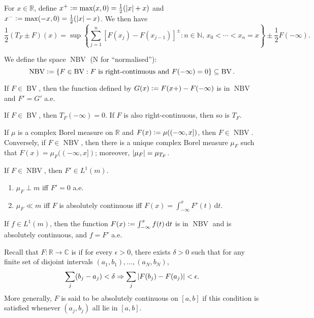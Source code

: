 \documentclass[12pt]{article}	%
\DeclareMathOperator{\BV}{BV}
\DeclareMathOperator{\NBV}{NBV}
\begin{document}
For $x \in \mathbb{R}$, define $x^{+} \vcentcolon= \max(x, 0) = \frac{1}{2}({\left\lvert x \right\lvert} + x)$ and $x^{-} \vcentcolon= \max(-x, 0) = \frac{1}{2}({\left\lvert x \right\lvert} - x)$. We then have
\begin{equation*} 
	\frac{1}{2}(T_{F} \pm F)(x) = \sup\left\{\sum_{j = 1}^{n} \left[F(x_{j}) - F(x_{j - 1})\right]^{\pm} : n \in \mathbb{N},\, x_{0} < \cdots < x_{n} = x \right\} \pm \frac{1}{2} F(-\infty).
\end{equation*}

We define the space $\NBV$ (N for ``normalised''):
\begin{equation*} 
	\NBV \vcentcolon= \{F \in \BV : F \text{ is right-continuous and } F(-\infty) = 0\} \subset \BV.
\end{equation*}

If $F \in \BV$, then the function defined by $G(x) \vcentcolon= F(x+) - F(-\infty)$ is in $\NBV$ and $F' = G'$ a.e.

\begin{prop}
	If $F \in \BV$, then $T_{F}(-\infty) = 0$. If $F$ is also right-continuous, then so is $T_{F}$.
\end{prop}

\begin{thm}
	If $\mu$ is a complex Borel measure on $\mathbb{R}$ and $F(x) \vcentcolon= \mu((-\infty, x])$, then $F \in \NBV$. \newline
	Conversely, if $F \in \NBV$, then there is a unique complex Borel measure $\mu_{F}$ such that $F(x) = \mu_{F}((-\infty, x])$; moreover, ${\left\lvert \mu_{F} \right\lvert} = \mu_{T_{F}}$.
\end{thm}

\begin{prop}
	If $F \in \NBV$, then $F' \in L^{1}(m)$.
	\begin{enumerate}
		\item $\mu_{F} \perp m$ iff $F' = 0$ a.e.
		\item $\mu_{F} \ll m$ iff $F$ is absolutely continuous iff $F(x) = \int_{-\infty}^{x} F'(t) \,{\mathrm{d}}t$.
	\end{enumerate}
	If $f \in L^{1}(m)$, then the function $F(x) \vcentcolon= \int_{-\infty}^{x} f(t) \,{\mathrm{d}}t$ is in $\NBV$ and is absolutely continuous, and $f = F'$ a.e. 
\end{prop}

Recall that $F : \mathbb{R} \to \mathbb{C}$ is  if for every $\epsilon > 0$, there exists $\delta > 0$ such that for any finite set of disjoint intervals $(a_{1}, b_{1}), \ldots, (a_{N}, b_{N})$,
\begin{equation*} 
	\sum_{j} (b_{j} - a_{j}) < \delta \Rightarrow \sum_{j} {\left\lvert F(b_{j}) - F(a_{j}) \right\lvert} < \epsilon.
\end{equation*}
More generally, $F$ is said to be absolutely continuous on $[a, b]$ if this condition is satisfied whenever $(a_{j}, b_{j})$ all lie in $[a, b]$.
\end{document}
